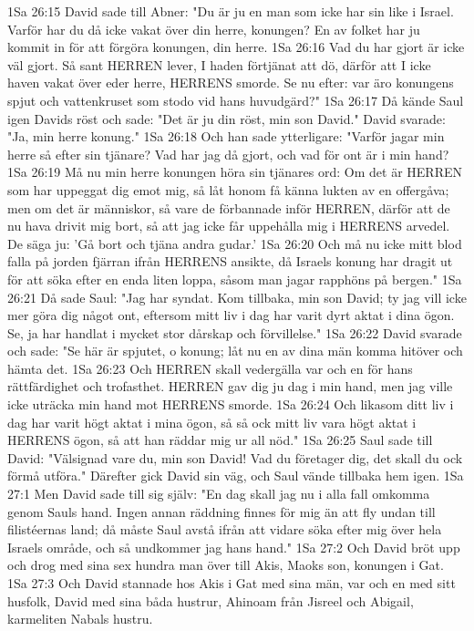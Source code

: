 1Sa 26:15  David sade till Abner: "Du är ju en man som icke har sin like i Israel. Varför har du då icke vakat över din herre, konungen? En av folket har ju kommit in för att förgöra konungen, din herre.
1Sa 26:16  Vad du har gjort är icke väl gjort. Så sant HERREN lever, I haden förtjänat att dö, därför att I icke haven vakat över eder herre, HERRENS smorde. Se nu efter: var äro konungens spjut och vattenkruset som stodo vid hans huvudgärd?"
1Sa 26:17  Då kände Saul igen Davids röst och sade: "Det är ju din röst, min son David." David svarade: "Ja, min herre konung."
1Sa 26:18  Och han sade ytterligare: "Varför jagar min herre så efter sin tjänare? Vad har jag då gjort, och vad för ont är i min hand?
1Sa 26:19  Må nu min herre konungen höra sin tjänares ord: Om det är HERREN som har uppeggat dig emot mig, så låt honom få känna lukten av en offergåva; men om det är människor, så vare de förbannade inför HERREN, därför att de nu hava drivit mig bort, så att jag icke får uppehålla mig i HERRENS arvedel. De säga ju: 'Gå bort och tjäna andra gudar.'
1Sa 26:20  Och må nu icke mitt blod falla på jorden fjärran ifrån HERRENS ansikte, då Israels konung har dragit ut för att söka efter en enda liten loppa, såsom man jagar rapphöns på bergen."
1Sa 26:21  Då sade Saul: "Jag har syndat. Kom tillbaka, min son David; ty jag vill icke mer göra dig något ont, eftersom mitt liv i dag har varit dyrt aktat i dina ögon. Se, ja har handlat i mycket stor dårskap och förvillelse."
1Sa 26:22  David svarade och sade: "Se här är spjutet, o konung; låt nu en av dina män komma hitöver och hämta det.
1Sa 26:23  Och HERREN skall vedergälla var och en för hans rättfärdighet och trofasthet. HERREN gav dig ju dag i min hand, men jag ville icke uträcka min hand mot HERRENS smorde.
1Sa 26:24  Och likasom ditt liv i dag har varit högt aktat i mina ögon, så så ock mitt liv vara högt aktat i HERRENS ögon, så att han räddar mig ur all nöd."
1Sa 26:25  Saul sade till David: "Välsignad vare du, min son David! Vad du företager dig, det skall du ock förmå utföra." Därefter gick David sin väg, och Saul vände tillbaka hem igen.
1Sa 27:1  Men David sade till sig själv: "En dag skall jag nu i alla fall omkomma genom Sauls hand. Ingen annan räddning finnes för mig än att fly undan till filistéernas land; då måste Saul avstå ifrån att vidare söka efter mig över hela Israels område, och så undkommer jag hans hand."
1Sa 27:2  Och David bröt upp och drog med sina sex hundra man över till Akis, Maoks son, konungen i Gat.
1Sa 27:3  Och David stannade hos Akis i Gat med sina män, var och en med sitt husfolk, David med sina båda hustrur, Ahinoam från Jisreel och Abigail, karmeliten Nabals hustru.
